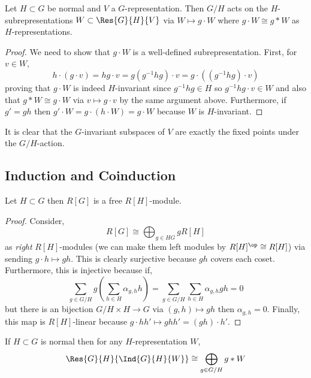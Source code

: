 \documentclass[12pt]{article}
\begin{document}
\begin{prop}
Let $H \subset G$ be normal and $V$ a $G$-representation. Then $G / H$ acts on the $H$-subrepresentations $W \subset \Res{G}{H}{V}$ via $W \mapsto g \cdot W$ where $g \cdot W \cong g * W$ as $H$-representations.
\end{prop}

\begin{proof}
We need to show that $g \cdot W$ is a well-defined subrepresentation. First, for $v \in W$,
\[ h \cdot (g \cdot v) = hg \cdot v = g(g^{-1} h g) \cdot v = g \cdot ((g^{-1} h g) \cdot v) \]
proving that $g \cdot W$ is indeed $H$-invariant since $g^{-1} h g \in H$ so $g^{-1} h g \cdot v \in W$ and also that $g * W \cong g \cdot W$ via $v \mapsto g \cdot v$ by the same argument above. Furthermore, if $g' = gh$ then $g' \cdot W = g \cdot (h \cdot W) = g \cdot W$ because $W$ is $H$-invariant. 
\end{proof}

\begin{rmk}
It is clear that the $G$-invariant subspaces of $V$ are exactly the fixed points under the $G/H$-action.
\end{rmk}

\subsection{Induction and Coinduction}

\begin{prop}
Let $H \subset G$ then $R[G]$ is a free $R[H]$-module.
\end{prop}

\begin{proof}
Consider, 
\[ R[G] \cong \bigoplus_{g \in H  G} g R[H] \]
as \textit{right} $R[H]$-modules (we can make them left modules by $R[H]^\op \cong R[H]$) via sending $g \cdot h \mapsto gh$. This is clearly surjective because $gh$ covers each coset. Furthermore, this is injective because if,
\[ \sum_{g \in G/H} g \left( \sum_{h \in H} \alpha_{g,h} h \right) = \sum_{g \in G / H} \sum_{h \in H} \alpha_{g,h} gh = 0 \]
but there is an bijection $G / H \times H \to G$ via $(g,h) \mapsto gh$ then $\alpha_{g,h} = 0$. Finally, this map is $R[H]$-linear because $g \cdot h h' \mapsto gh h' = (gh) \cdot h'$.
\end{proof}

\begin{prop}
If $H \subset G$ is normal then for any $H$-representation $W$,
\[ \Res{G}{H}{\Ind{G}{H}{W}} \cong \bigoplus_{g \in G / H} g * W \]
\end{prop}
\end{document}

